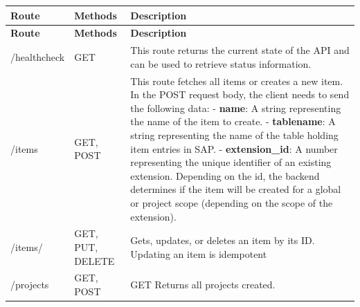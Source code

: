 \begin{longtable}{|l|p{3cm}|>{\raggedright\arraybackslash}p{7cm}|}
    \hline
    \rowcolor{headercolor} \textbf{Route} & \textbf{Methods} & \textbf{Description} \\
    \endfirsthead

    \hline
    \rowcolor{headercolor} \textbf{Route} & \textbf{Methods} & \textbf{Description} \\
    \endhead

    \hline
    /healthcheck & GET & This route returns the current state of the API and can be used to retrieve status information. \\
    \hline
    /items & GET, POST & This route fetches all items or creates a new item.
    In the POST request body, the client needs to send the following data:
    \newline\newline  - \textbf{name}: A string representing the name of the item to create.
    \newline\newline - \textbf{tablename}: A string representing the name of the table holding item entries in SAP.
    \newline\newline - \textbf{extension\_id}: A number representing the unique identifier of an existing extension. Depending on the id, the backend determines if the item will be created for a global or project scope (depending on the scope of the extension). \\
    \hline
    /items/ & GET, PUT, DELETE & Gets, updates, or deletes an item by its ID. Updating an item is idempotent \\
    \hline
    /projects & GET, POST & GET Returns all projects created.


\end{longtable}
